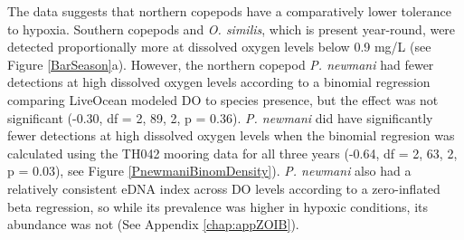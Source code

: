 \documentclass[12pt,twoside]{reedthesis}
\begin{document}
	The data suggests that northern copepods have a comparatively lower tolerance to hypoxia. Southern copepods and \textit{O. similis}, which is present year-round, were detected proportionally more at dissolved oxygen levels below 0.9 mg/L (see Figure \ref{BarSeason}a). However, the northern copepod \textit{P. newmani} had fewer detections at high dissolved oxygen levels according to a binomial regression comparing LiveOcean modeled DO to species presence, but the effect was not significant (-0.30, df = 2, 89, 2, p = 0.36). \textit{P. newmani} did have significantly fewer detections at high dissolved oxygen levels when the binomial regresion was calculated using the TH042 mooring data for all three years (-0.64, df = 2, 63, 2, p = 0.03), see Figure \ref{PnewmaniBinomDensity}). \textit{P. newmani} also had a relatively consistent eDNA index across DO levels according to a zero-inflated beta regression, so while its prevalence was higher in hypoxic conditions, its abundance was not (See Appendix \ref{chap:appZOIB}). 
	
\end{document}
